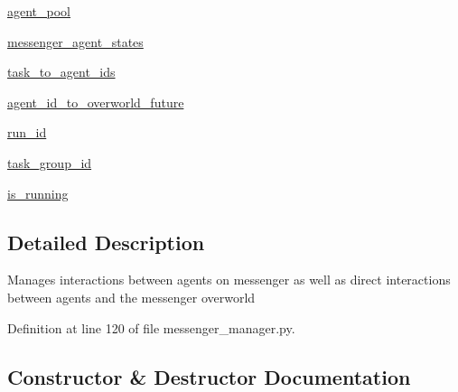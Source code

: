 \begin{DoxyCompactItemize}
\item 
\hyperlink{classparlai_1_1messenger_1_1core_1_1messenger__manager_1_1MessengerManager_a8913036d1cbffd57543a63b0f48c9c0e}{agent\+\_\+pool}
\item 
\hyperlink{classparlai_1_1messenger_1_1core_1_1messenger__manager_1_1MessengerManager_ae4bbc2d71e28d3be4fa29bb745d29f1b}{messenger\+\_\+agent\+\_\+states}
\item 
\hyperlink{classparlai_1_1messenger_1_1core_1_1messenger__manager_1_1MessengerManager_a6a69872a10837de73c265c18374d53d3}{task\+\_\+to\+\_\+agent\+\_\+ids}
\item 
\hyperlink{classparlai_1_1messenger_1_1core_1_1messenger__manager_1_1MessengerManager_a829598d33bc7fd9bb846d15d37a5c198}{agent\+\_\+id\+\_\+to\+\_\+overworld\+\_\+future}
\item 
\hyperlink{classparlai_1_1messenger_1_1core_1_1messenger__manager_1_1MessengerManager_afcdbc65efd85d23cb5630f92d2319611}{run\+\_\+id}
\item 
\hyperlink{classparlai_1_1messenger_1_1core_1_1messenger__manager_1_1MessengerManager_a061555265cacbc4032e0400dc59561fe}{task\+\_\+group\+\_\+id}
\item 
\hyperlink{classparlai_1_1messenger_1_1core_1_1messenger__manager_1_1MessengerManager_a4c496e469b356d2f13f7c6bc5fc42d37}{is\+\_\+running}
\end{DoxyCompactItemize}


\subsection{Detailed Description}
\begin{DoxyVerb}Manages interactions between agents on messenger as well as direct
interactions between agents and the messenger overworld
\end{DoxyVerb}
 

Definition at line 120 of file messenger\+\_\+manager.\+py.



\subsection{Constructor \& Destructor Documentation}
\mbox{\label{classparlai_1_1messenger_1_1core_1_1messenger__manager_1_1MessengerManager_ae6df147d84dc7760affada88f393d0cd}} 

